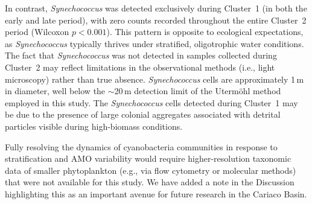 \documentclass[12pt,english]{reviewresponse}
\begin{document}
\begin{revresponse}
    In contrast, \textit{Synechococcus} was detected exclusively during Cluster~1 (in both the early and late period), with zero counts recorded throughout the entire Cluster~2 period (Wilcoxon $p < 0.001$). This pattern is opposite to ecological expectations, as \textit{Synechococcus} typically thrives under stratified, oligotrophic water conditions. The fact that \textit{Synechococcus} was not detected in samples collected during Cluster~2 may reflect limitations in the observational methods (i.e., light microscopy) rather than true absence. \textit{Synechococcus} cells are approximately 1\,\textmu m in diameter, well below the $\sim$20\,\textmu m detection limit of the Utermöhl method employed in this study. The \textit{Synechococcus} cells detected during Cluster~1 may be due to the presence of large colonial aggregates associated with detrital particles visible during high-biomass conditions.

    Fully resolving the dynamics of cyanobacteria communities in response to stratification and AMO variability would require higher-resolution taxonomic data of smaller phytoplankton (e.g., via flow cytometry or molecular methods) that were not available for this study. We have added a note in the Discussion highlighting this as an important avenue for future research in the Cariaco Basin.
\end{revresponse}
\end{document}
